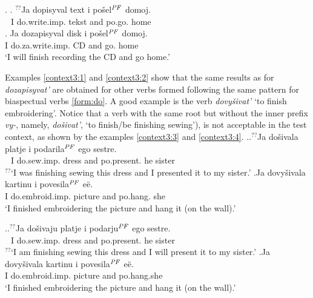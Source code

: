 \ex.\label{context2} \ag. \label{context1:2}$^{??}$Ja dopisyval text i po\v{s}el$^{\mathit{PF}}$ domoj.\\
{\textcolor{white}{$^{??}$}}I do.write.imp. tekst and po.go. home\\
\bg. \label{context2:2}Ja dozapisyval disk i po\v{s}el$^{\mathit{PF}}$ domoj.\\
I do.za.write.imp. CD and go. home\\
\vspace{0.5em}
`I will finish recording the CD and go home.'

Examples \ref{context3:1} and \ref{context3:2} show that the same results as for \textit{dozapisyvat'} are obtained for other verbs formed following the same pattern for biaspectual verbs \ref{form:do}. A good example is the verb \textit{dovy\v{s}ivat'} `to finish embroidering'. Notice that a verb with the same root but without the inner prefix \textit{vy-}, namely, \textit{do\v{s}ivat'}, `to finish/be finishing sewing'), is not acceptable in the test context, as shown by the examples \ref{context3:3} and \ref{context3:4}.
\ex.\label{context3}\ag.\label{context3:3}$^{??}$Ja do\v{s}ivala platje i podarila$^{\mathit{PF}}$ ego sestre.\\
{\textcolor{white}{$^{??}$}}I do.sew.imp. dress and po.present. he sister\\
$^{??}$`I was finishing sewing this dress and I presented it to my sister.'
\bg.\label{context3:1}Ja dovy\v{s}ivala kartinu i povesila$^{\mathit{PF}}$ e\"e.\\
I do.embroid.imp. picture and po.hang. she\\
\vspace{0.5em}
`I finished embroidering the picture and hang it (on the wall).'

\ex.\label{context31}\ag.\label{context3:4}$^{??}$Ja do\v{s}ivaju platje i podarju$^{\mathit{PF}}$ ego sestre.\\
{\textcolor{white}{$^{??}$}}I do.sew.imp. dress and po.present. he sister\\
$^{??}$`I am finishing sewing this dress and I will present it to my sister.'
\bg.\label{context3:2}Ja dovy\v{s}ivala kartinu i povesila$^{\mathit{PF}}$ e\"e.\\
I do.embroid.imp. picture and po.hang.she\\
\vspace{0.5em}
`I finished embroidering the picture and hang it (on the wall).'

